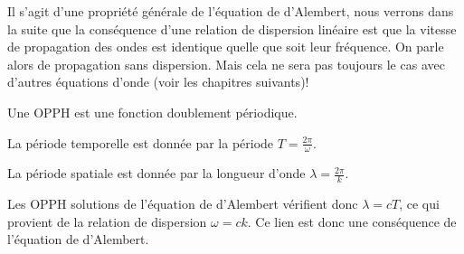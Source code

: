 \documentclass[12pt,fancy]{cours}
\begin{document}
\begin{remarque}
 Il s'agit d'une propriété générale de l'équation de d'Alembert, nous verrons dans la suite que la conséquence d'une relation de dispersion linéaire est que la vitesse de propagation des ondes est identique quelle que soit leur fréquence. On parle alors de propagation sans dispersion. Mais cela ne sera pas toujours le cas avec d'autres équations d'onde (voir les chapitres suivants)!
 \end{remarque}

Une OPPH est une fonction doublement périodique.
\begin{liste}
  \item La période temporelle est donnée par la période $T = \frac{2\pi}{\omega}$. 
  \item La période spatiale est donnée par la longueur d'onde $\lambda = \frac{2\pi}{k}$.
\end{liste}
Les OPPH solutions de l’équation de d’Alembert vérifient donc $\lambda=cT$, ce qui provient de la relation de dispersion $\omega=ck$. Ce lien est donc une conséquence de l'équation de d'Alembert.

\end{document}
